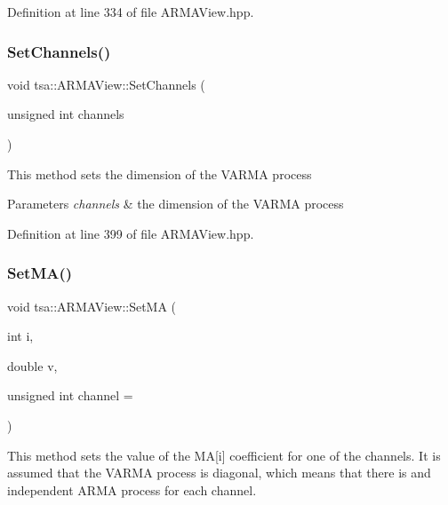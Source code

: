 Definition at line 334 of file A\+R\+M\+A\+View.\+hpp.

\mbox{\label{classtsa_1_1_a_r_m_a_view_a14f528f407a13473a7c20a0d7dec6482}} 
\subsubsection{\texorpdfstring{Set\+Channels()}{SetChannels()}}
{\footnotesize\ttfamily void tsa\+::\+A\+R\+M\+A\+View\+::\+Set\+Channels (\begin{DoxyParamCaption}\item[{unsigned int}]{channels }\end{DoxyParamCaption})\hspace{0.3cm}{\ttfamily [inline]}}

This method sets the dimension of the V\+A\+R\+MA process


\begin{DoxyParams}{Parameters}
{\em channels} & the dimension of the V\+A\+R\+MA process \\
\hline
\end{DoxyParams}


Definition at line 399 of file A\+R\+M\+A\+View.\+hpp.

\mbox{\label{classtsa_1_1_a_r_m_a_view_a0fb548001ea80ac198ecf5619090320e}} 
\subsubsection{\texorpdfstring{Set\+M\+A()}{SetMA()}}
{\footnotesize\ttfamily void tsa\+::\+A\+R\+M\+A\+View\+::\+Set\+MA (\begin{DoxyParamCaption}\item[{int}]{i,  }\item[{double}]{v,  }\item[{unsigned int}]{channel = {} }\end{DoxyParamCaption})\hspace{0.3cm}{\ttfamily [inline]}}

This method sets the value of the MA\mbox{[}i\mbox{]} coefficient for one of the channels. It is assumed that the V\+A\+R\+MA process is diagonal, which means that there is and independent A\+R\+MA process for each channel.


